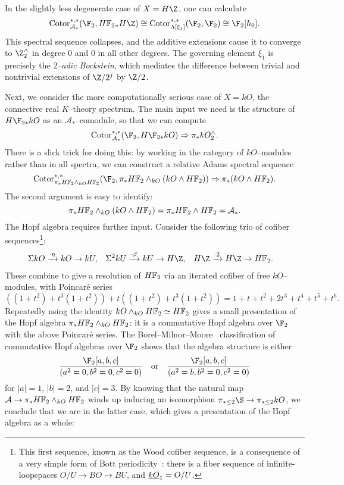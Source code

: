 \begin{example}
In the slightly less degenerate case of $X = H\Z$, one can calculate \[\Cotor^{*, *}_{\mathcal A_*}(\F_2, \HFtwo_* H\Z) \cong \Cotor^{*, *}_{\Lambda[\xi_1]}(\F_2, \F_2) \cong \F_2[h_0].\]  This spectral sequence collapses, and the additive extensions cause it to converge to $\Z^\wedge_2$ in degree $0$ and $0$ in all other degrees.  The governing element $\xi_1$ is precisely the \textit{$2$--adic Bockstein}, which mediates the difference between trivial and nontrivial extensions of $\Z/2^j$ by $\Z/2$.
\end{example}

\begin{example}\label{kOASSExample}
Next, we consider the more computationally serious case of $X = kO$, the connective real $K$--theory spectrum.  The main input we need is the structure of $H\F_{2*} kO$ as an $\mathcal A_*$--comodule, so that we can compute \[\Cotor_{\mathcal A_*}^{*, *}(\F_2, H\F_{2*} kO) \Rightarrow \pi_* kO^\wedge_2.\]  There is a slick trick for doing this: by working in the category of $kO$--modules rather than in all spectra, we can construct a relative Adams spectral sequence \[\Cotor_{\pi_* \HFtwo \sm_{kO} \HFtwo}^{*, *}(\F_2, \pi_* \HFtwo \sm_{kO}(kO \sm \HFtwo)) \Rightarrow \pi_*(kO \sm \HFtwo).\]  The second argument is easy to identify: \[\pi_* \HFtwo \sm_{kO}(kO \sm \HFtwo) = \pi_* \HFtwo \sm \HFtwo = \mathcal A_*.\]  The Hopf algebra requires further input.  Consider the following trio of cofiber sequences\footnote{This first sequence, known as the Wood cofiber sequence, is a consequence of a very simple form of Bott periodicity~\cite[Section 5]{Harris}: there is a fiber sequence of infinite-loopspaces $O/U \to BO \to BU$, and $\underline{\smash{kO}}_{1} = O/U$.}:
\begin{align*}
\Susp kO & \xrightarrow{\cdot \eta} kO \to kU, &
\Susp^2 kU & \xrightarrow{\cdot \beta} kU \to H\Z, &
H\Z & \xrightarrow{\cdot 2} H\Z \to \HFtwo.
\end{align*}
These combine to give a resolution of $\HFtwo$ via an iterated cofiber of free $kO$--modules, with Poincar\'e series \[((1 + t^2) + t^3(1 + t^2)) + t((1 + t^2) + t^3(1 + t^2)) = 1 + t + t^2 + 2t^3 + t^4 + t^5 + t^6.\]  Repeatedly using the identity $kO \sm_{kO} \HFtwo \simeq \HFtwo$ gives a small presentation of the Hopf algebra $\pi_* \HFtwo \sm_{kO} \HFtwo$: it is a commutative Hopf algebra over $\F_2$ with the above Poincar\'e series.  The Borel--Milnor--Moore~\cite[Theorem 7.11]{MilnorMoore} classification of commutative Hopf algebras over $\F_2$ shows that the algebra structure is either \[\frac{\F_2[a, b, c]}{(a^2 = 0, b^2 = 0, c^2 = 0)} \quad \text{or} \quad \frac{\F_2[a, b, c]}{(a^2 = b, b^2 = 0, c^2 = 0)}\] for $|a| = 1$, $|b| = 2$, and $|c| = 3$.  By knowing that the natural map $\mathcal A \to \pi_* \HFtwo \sm_{kO} \HFtwo$ winds up inducing an isomorphism $\pi_{* \le 2} \S \to \pi_{* \le 2} kO$, we conclude that we are in the latter case, which gives a presentation of the Hopf algebra as a whole:

\end{example}

